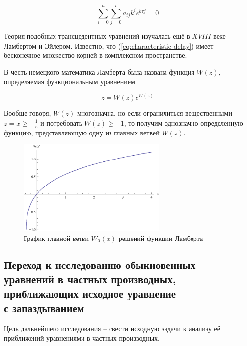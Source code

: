 \begin{equation}\label{eq:characteristic-delay}
\sum\limits_{i=0}^{n} \sum\limits_{j=0}^{l} a_{ij} k^i e^{k \tau j} = 0
\end{equation}

Теория подобных трансцедентных уравнений изучалась ещё в $XVIII$ веке Ламбертом и Эйлером. Известно, что (\ref{eq:characteristic-delay}) имеет бесконечное множество корней в комплексном пространстве.

В честь немецкого математика Ламберта была названа функция $W(z)$, определяемая функциональным уравнением

\begin{equation}
z = W(z) e^{W(z)}
\end{equation}

Вообще говоря, $W(z)$ многозначна, но если ограничиться вещественными $z = x \geq -\frac{1}{e}$ и потребовать $W(z) \geq -1$, то получим однозначно определенную функцию, представляющую одну из главных ветвей $W(z)$:

\begin{figure}
\begin{center}
\includegraphics[width=0.65\textwidth]{./1_modelling/Lambert.eps}
\end{center}
\caption{График главной ветви $W_0(x)$ решений функции Ламберта}
\end{figure}

\subsection{Переход к исследованию обыкновенных\\уравнений в частных производных,\\приближающих исходное уравнение\\с запаздыванием}

Цель дальнейшего исследования \--- свести исходную задачи к анализу её приближений уравнениями в частных производных.

